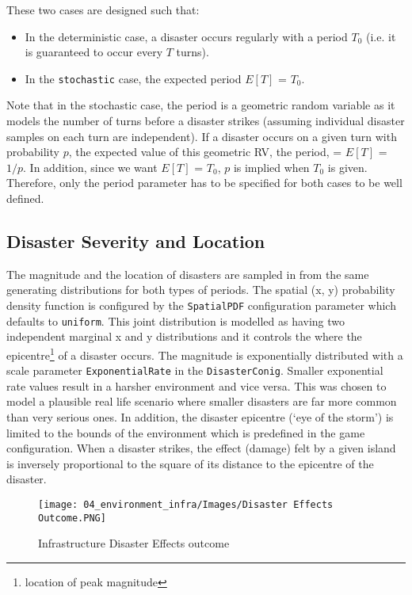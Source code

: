 These two cases are designed such that:
\begin{itemize}
    \item In the deterministic case, a disaster occurs regularly with a period $T_{0}$ (i.e. it is guaranteed to occur every $T$ turns).
    \item In the \texttt{stochastic} case, the expected period $E[T]$ = $T_0$.
\end{itemize}

Note that in the stochastic case, the period is a geometric random variable as it models the number of turns before a disaster strikes (assuming individual disaster samples on each turn are independent). If a disaster occurs on a given turn with probability $p$, the expected value of this geometric RV, the period, = $E[T]$ = $1/p$. In addition, since we want
$E[T]$ = $T_{0}$, $p$ is implied when $T_{0}$ is given. Therefore, only the period parameter has to be specified for both cases to be well defined.

\subsection {Disaster Severity and Location}

The magnitude and the location of disasters are sampled in from the same generating distributions for both types of periods.
The spatial (x, y) probability density function is configured by the \texttt{SpatialPDF} configuration parameter which defaults to \texttt{uniform}. This joint distribution is modelled as having two independent marginal x and y distributions and it controls the where the epicentre\footnote{location of peak magnitude} of a disaster occurs. The magnitude is exponentially distributed with a scale parameter \texttt{ExponentialRate} in the \texttt{DisasterConig}. Smaller exponential rate values result in a harsher environment and vice versa. This was chosen to model a plausible real life scenario where smaller disasters are far more common than very serious ones.
In addition, the disaster epicentre (`eye of the storm') is limited to the bounds of the environment which is predefined in the game configuration. When a disaster strikes, the effect (damage) felt by a given island is inversely proportional to the square of its distance to the epicentre of the disaster.

\begin{figure}[!htb]
    \centering
    \texttt{[image: 04\_environment\_infra/Images/Disaster Effects Outcome.PNG]}
    \caption{Infrastructure Disaster Effects outcome}
    \label{fig:Disaster Effects Outcome}
\end{figure}

